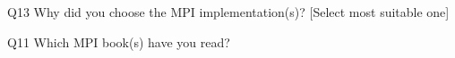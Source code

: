 \begin{description}%
\item{Q13} Why did you choose the MPI implementation(s)? [Select most suitable one]%
\item{Q11} Which MPI book(s) have you read?%
\end{description}%

